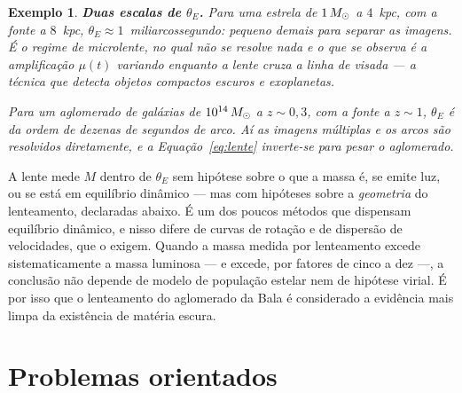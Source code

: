 \documentclass[12pt,a4paper,oneside]{book}
\theoremstyle{rgplain}
\newtheorem{example}{Exemplo}[chapter]
\theoremstyle{rgremark}
\begin{document}
\begin{example}
\textbf{Duas escalas de $\theta_E$.} Para uma estrela de $1\,M_\odot$ a
$4$~kpc, com a fonte a $8$~kpc, $\theta_E\approx1$~miliarcossegundo: pequeno
demais para separar as imagens. É o regime de \emph{microlente}, no qual não
se resolve nada e o que se observa é a amplificação $\mu(t)$ variando
enquanto a lente cruza a linha de visada --- a técnica que detecta objetos
compactos escuros e exoplanetas.

Para um aglomerado de galáxias de $10^{14}\,M_\odot$ a $z\sim0{,}3$, com a
fonte a $z\sim1$, $\theta_E$ é da ordem de dezenas de segundos de arco. Aí as
imagens múltiplas e os arcos são resolvidos diretamente, e a
Equação~\eqref{eq:lente} inverte-se para \emph{pesar} o aglomerado.
\end{example}

\begin{central}
A lente mede $M$ dentro de $\theta_E$ sem hipótese sobre o que a massa é, se
emite luz, ou se está em equilíbrio dinâmico --- mas com hipóteses sobre a
\emph{geometria} do lenteamento, declaradas abaixo. É um dos poucos métodos
que dispensam equilíbrio dinâmico, e nisso difere de curvas de rotação e de
dispersão de velocidades, que o exigem. Quando a massa medida por lenteamento excede
sistematicamente a massa luminosa --- e excede, por fatores de cinco a dez
---, a conclusão não depende de modelo de população estelar nem de hipótese
virial. É por isso que o lenteamento do aglomerado da Bala é considerado a
evidência mais limpa da existência de matéria escura.
\end{central}

\section{Problemas orientados}
\end{document}
